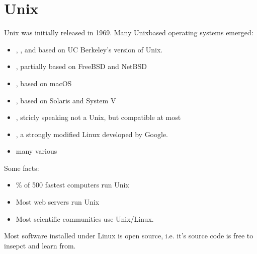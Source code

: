 \documentclass[a4paper,10pt,english]{jupyterBook}
\begin{document}
\chapter{Unix}
\label{\detokenize{text/progtut/unix:unix}}\label{\detokenize{text/progtut/unix::doc}}
\sphinxAtStartPar
Unix was initially released in 1969. Many Unix\sphinxhyphen{}based operating systems emerged:
\begin{itemize}
\item {} 
\sphinxAtStartPar
{}, , and  based on UC Berkeley’s version of Unix.

\item {} 
\sphinxAtStartPar
{}, partially based on FreeBSD and NetBSD

\item {} 
\sphinxAtStartPar
{}, based on macOS

\item {} 
\sphinxAtStartPar
{}, based on Solaris and System V

\item {} 
\sphinxAtStartPar
{}, stricly speaking not a Unix, but compatible at most

\item {} 
\sphinxAtStartPar
{}, a strongly modified Linux developed by Google.

\item {} 
\sphinxAtStartPar
many various 

\end{itemize}

\sphinxAtStartPar
Some facts:
\begin{itemize}
\item {} 
\% of 500 fastest computers run Unix

\item {} 
\sphinxAtStartPar
Most web servers run Unix

\item {} 
\sphinxAtStartPar
Most scientific communities use Unix/Linux.

\end{itemize}

\sphinxAtStartPar
Most software installed under Linux is open source, i.e. it’s source code is
free to insepct and learn from.
\end{document}
